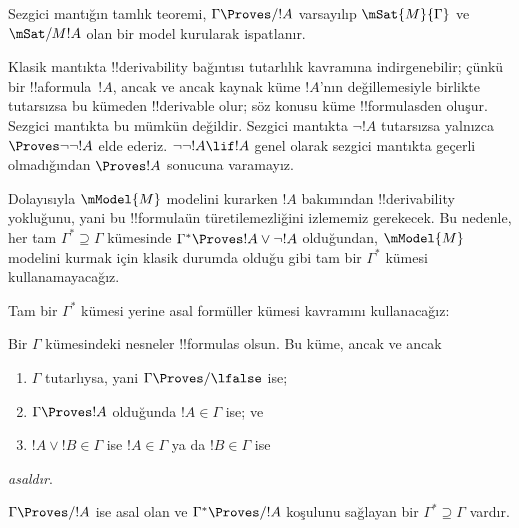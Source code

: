 



Sezgici mantığın tamlık teoremi, $\Gamma\Proves/ !A$ varsayılıp
$\mSat{M}{\Gamma}$ ve $\mSat/{M}{!A}$ olan bir model kurularak ispatlanır.

Klasik mantıkta !!{derivability} bağıntısı tutarlılık kavramına
indirgenebilir; çünkü bir !!a{formula}~$!A$, ancak ve ancak kaynak küme
$!A$'nın değillemesiyle birlikte tutarsızsa bu kümeden !!{derivable} olur;
söz konusu küme !!{formula}s{}den oluşur. Sezgici mantıkta bu mümkün değildir.
Sezgici mantıkta
$\lnot !A$ tutarsızsa yalnızca $\Proves\lnot\lnot !A$ elde ederiz.
$\lnot\lnot !A\lif !A$ genel olarak sezgici mantıkta geçerli olmadığından
$\Proves !A$ sonucuna varamayız.

Dolayısıyla $\mModel{M}$ modelini kurarken $!A$ bakımından
!!{derivability} yokluğunu, yani bu !!{formula}{}ün türetilemezliğini
izlememiz gerekecek. Bu nedenle, her tam
$\Gamma^*\supseteq\Gamma$ kümesinde
$\Gamma^*\Proves !A\lor\lnot !A$ olduğundan, $\mModel{M}$ modelini kurmak
için klasik durumda olduğu gibi tam bir $\Gamma^*$ kümesi kullanamayacağız.

Tam bir $\Gamma^*$ kümesi yerine asal formüller kümesi kavramını
kullanacağız:

\begin{defn}
  Bir $\Gamma$ kümesindeki nesneler !!{formula}s olsun. Bu küme, ancak ve ancak
  \begin{enumerate}
  \item{} $\Gamma$ tutarlıysa, yani
    $\Gamma\Proves/\lfalse$ ise;
  \item{} $\Gamma\Proves !A$ olduğunda $!A\in\Gamma$ ise; ve
  \item{} $!A\lor !B\in\Gamma$ ise $!A\in\Gamma$ ya da
    $!B\in\Gamma$ ise
  \end{enumerate}
  \emph{asaldır}.
\end{defn}

\begin{lem}
   $\Gamma\Proves/ !A$ ise asal olan ve
  $\Gamma^*\Proves/ !A$ koşulunu sağlayan bir
  $\Gamma^*\supseteq\Gamma$ vardır.
\end{lem}

